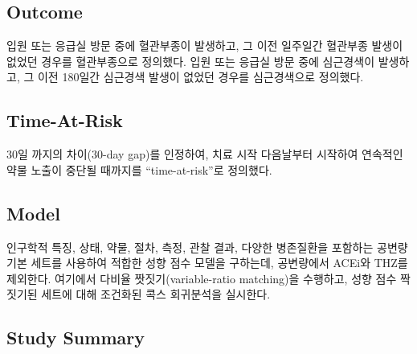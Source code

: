 \documentclass[11pt]{book}
\theoremstyle{definition}
\theoremstyle{definition}
\theoremstyle{definition}
\theoremstyle{remark}
\begin{document}
\subsection{Outcome}\label{outcome-1}

입원 또는 응급실 방문 중에 혈관부종이 발생하고, 그 이전 일주일간
혈관부종 발생이 없었던 경우를 혈관부종으로 정의했다. 입원 또는 응급실
방문 중에 심근경색이 발생하고, 그 이전 180일간 심근경색 발생이 없었던
경우를 심근경색으로 정의했다.

\subsection{Time-At-Risk}\label{time-at-risk-1}

30일 까지의 차이(30-day gap)를 인정하여, 치료 시작 다음날부터 시작하여
연속적인 약물 노출이 중단될 때까지를 ``time-at-risk''로 정의했다.

\subsection{Model}\label{model}

인구학적 특징, 상태, 약물, 절차, 측정, 관찰 결과, 다양한 병존질환을
포함하는 공변량 기본 세트를 사용하여 적합한 성향 점수 모델을 구하는데,
공변량에서 ACEi와 THZ를 제외한다. 여기에서 다비율 짯짓기(variable-ratio
matching)을 수행하고, 성향 점수 짝짓기된 세트에 대해 조건화된 콕스
회귀분석을 실시한다.

\subsection{Study Summary}\label{study-summary}
\end{document}
